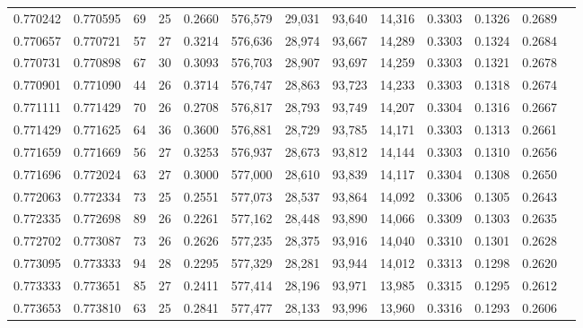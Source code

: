 \begin{tabular}{rrrrrrrrrrrrr}
0.770242 & 0.770595 &     69 &    25 &                                     0.2660 & 576,579 &  29,031 &  93,640 &  14,316 & 0.3303 & 0.1326 & 0.2689 \\
0.770657 & 0.770721 &     57 &    27 &                                     0.3214 & 576,636 &  28,974 &  93,667 &  14,289 & 0.3303 & 0.1324 & 0.2684 \\
0.770731 & 0.770898 &     67 &    30 &                                     0.3093 & 576,703 &  28,907 &  93,697 &  14,259 & 0.3303 & 0.1321 & 0.2678 \\
0.770901 & 0.771090 &     44 &    26 &                                     0.3714 & 576,747 &  28,863 &  93,723 &  14,233 & 0.3303 & 0.1318 & 0.2674 \\
0.771111 & 0.771429 &     70 &    26 &                                     0.2708 & 576,817 &  28,793 &  93,749 &  14,207 & 0.3304 & 0.1316 & 0.2667 \\
0.771429 & 0.771625 &     64 &    36 &                                     0.3600 & 576,881 &  28,729 &  93,785 &  14,171 & 0.3303 & 0.1313 & 0.2661 \\
0.771659 & 0.771669 &     56 &    27 &                                     0.3253 & 576,937 &  28,673 &  93,812 &  14,144 & 0.3303 & 0.1310 & 0.2656 \\
0.771696 & 0.772024 &     63 &    27 &                                     0.3000 & 577,000 &  28,610 &  93,839 &  14,117 & 0.3304 & 0.1308 & 0.2650 \\
0.772063 & 0.772334 &     73 &    25 &                                     0.2551 & 577,073 &  28,537 &  93,864 &  14,092 & 0.3306 & 0.1305 & 0.2643 \\
0.772335 & 0.772698 &     89 &    26 &                                     0.2261 & 577,162 &  28,448 &  93,890 &  14,066 & 0.3309 & 0.1303 & 0.2635 \\
0.772702 & 0.773087 &     73 &    26 &                                     0.2626 & 577,235 &  28,375 &  93,916 &  14,040 & 0.3310 & 0.1301 & 0.2628 \\
0.773095 & 0.773333 &     94 &    28 &                                     0.2295 & 577,329 &  28,281 &  93,944 &  14,012 & 0.3313 & 0.1298 & 0.2620 \\
0.773333 & 0.773651 &     85 &    27 &                                     0.2411 & 577,414 &  28,196 &  93,971 &  13,985 & 0.3315 & 0.1295 & 0.2612 \\
0.773653 & 0.773810 &     63 &    25 &                                     0.2841 & 577,477 &  28,133 &  93,996 &  13,960 & 0.3316 & 0.1293 & 0.2606 \\

\end{tabular}
